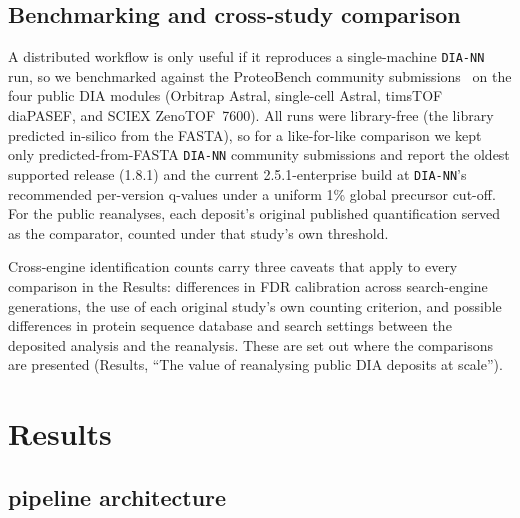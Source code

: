 \documentclass[preprint,12pt]{elsarticle}
\begin{document}
\subsection{Benchmarking and cross-study comparison}
\label{sec:benchmarking}
A distributed workflow is only useful if it reproduces a single-machine \texttt{DIA-NN} run, so we benchmarked \quantmsdiann{} against the ProteoBench community submissions~\cite{devreese2025proteobench} on the four public DIA modules (Orbitrap Astral, single-cell Astral, timsTOF diaPASEF, and SCIEX ZenoTOF~7600). All \quantmsdiann{} runs were library-free (the library predicted in-silico from the FASTA), so for a like-for-like comparison we kept only predicted-from-FASTA \texttt{DIA-NN} community submissions and report the oldest supported release (1.8.1) and the current 2.5.1-enterprise build at \texttt{DIA-NN}'s recommended per-version q-values under a uniform 1\% global precursor cut-off. For the public reanalyses, each deposit's original published quantification served as the comparator, counted under that study's own threshold.

Cross-engine identification counts carry three caveats that apply to every comparison in the Results: differences in FDR calibration across search-engine generations, the use of each original study's own counting criterion, and possible differences in protein sequence database and search settings between the deposited analysis and the reanalysis. These are set out where the comparisons are presented (Results, ``The value of reanalysing public DIA deposits at scale'').

\section{Results}
\label{sec:results}
\subsection{\quantmsdiann{} pipeline architecture}
\label{sec:architecture}
\end{document}
